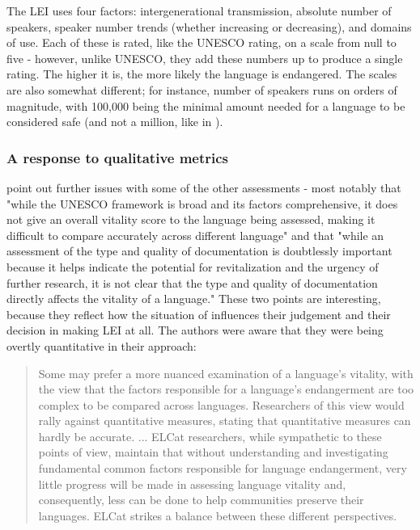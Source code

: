 The LEI uses four factors: intergenerational transmission, absolute number of speakers, speaker number trends (whether increasing or decreasing), and domains of use. Each of these is rated, like the UNESCO rating, on a scale from null to five - however, unlike UNESCO, they add these numbers up to produce a single rating. The higher it is, the more likely the language is endangered. The scales are also somewhat different; for instance, number of speakers runs on orders of magnitude, with 100,000 being the minimal amount needed for a language to be considered safe (and not a million, like in \citet{krauss2007classification}).

\subsubsection{A response to qualitative metrics}
\label{subsubsec:response}

\citet{lee2016assessing} point out further issues with some of the other assessments - most notably that "while the UNESCO framework is broad and its factors comprehensive, it does not give an overall vitality score to the language being assessed, making it difficult to compare accurately across different language" and that "while an assessment of the type and quality of documentation is doubtlessly important because it helps indicate the potential for revitalization and the urgency of further research, it is not clear that the type and quality of documentation directly affects the vitality of a language." These two points are interesting, because they reflect how the situation of \citet{lee2016assessing} influences their judgement and their decision in making LEI at all. The authors were aware that they were being overtly quantitative in their approach:

\begin{quote}
Some may prefer a more nuanced examination of a language's vitality, with the view that the factors responsible for a language's endangerment are too complex to be compared across languages. Researchers of this view would rally against quantitative measures, stating that quantitative measures can hardly be accurate. ... ELCat researchers, while sympathetic to these points of view, maintain that without understanding and investigating fundamental common factors responsible for language endangerment, very little pro\-gress will be made in assessing language vitality and, consequently, less can be done to help communities preserve their languages. ELCat strikes a balance between these different perspectives. \citep[279]{lee2016assessing}
\end{quote}

